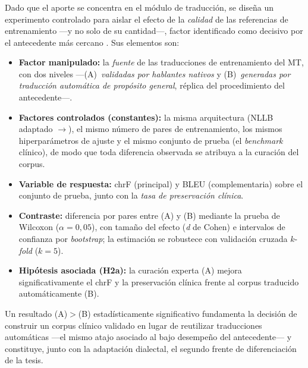 \subsubsection{}
\begin{bloqueObsCuatro}
\noindent Dado que el aporte se concentra en el m{\'o}dulo de traducci{\'o}n, se dise{\~n}a un
experimento controlado para aislar el efecto de la \emph{calidad} de las referencias de
entrenamiento ---y no solo de su cantidad---, factor identificado como decisivo por el antecedente
m{\'a}s cercano \parencite{QuispePalomino2026}. Sus elementos son:

\begin{itemize}\setlength{\itemsep}{1pt}
  \item \textbf{Factor manipulado:} la \emph{fuente} de las traducciones de entrenamiento del MT, con
  dos niveles ---(A)~\emph{validadas por hablantes nativos}  y (B)~\emph{generadas por
  traducci{\'o}n autom{\'a}tica de prop{\'o}sito general}, r{\'e}plica del procedimiento del
  antecedente---.
  \item \textbf{Factores controlados (constantes):} la misma arquitectura (NLLB adaptado
  $\to$), el mismo n{\'u}mero de pares de entrenamiento, los mismos
  hiperpar{\'a}metros de ajuste y el mismo conjunto de prueba (el \emph{benchmark} cl{\'i}nico), de
  modo que toda diferencia observada se atribuya a la curaci{\'o}n del corpus.
  \item \textbf{Variable de respuesta:} chrF (principal) y BLEU (complementaria) sobre el conjunto de
  prueba, junto con la \emph{tasa de preservaci{\'o}n cl{\'i}nica}.
  \item \textbf{Contraste:} diferencia por pares entre (A) y (B) mediante la prueba de Wilcoxon
  ($\alpha=0{,}05$), con tama{\~n}o del efecto (\emph{d} de Cohen) e intervalos de confianza por
  \emph{bootstrap}; la estimaci{\'o}n se robustece con validaci{\'o}n cruzada $k$-\emph{fold} ($k=5$).
  \item \textbf{Hip{\'o}tesis asociada (H2a):} la curaci{\'o}n experta (A) mejora significativamente el
  chrF y la preservaci{\'o}n cl{\'i}nica frente al corpus traducido autom{\'a}ticamente (B).
\end{itemize}

\noindent Un resultado (A)$>$(B) estad{\'i}sticamente significativo fundamenta la decisi{\'o}n de
construir un corpus cl{\'i}nico validado en lugar de reutilizar traducciones autom{\'a}ticas ---el
mismo atajo asociado al bajo desempe{\~n}o del antecedente--- y constituye, junto con la adaptaci{\'o}n
dialectal, el segundo frente de diferenciaci{\'o}n de la tesis.
\end{bloqueObsCuatro}

